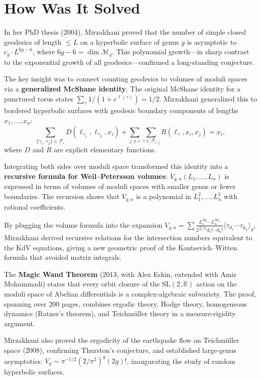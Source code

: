 \section{How Was It Solved}

In her PhD thesis (2004), Mirzakhani proved that the number of simple closed geodesics of length $\le L$ on a hyperbolic surface of genus $g$ is asymptotic to $c_g \cdot L^{6g-6}$, where $6g-6 = \dim\mathcal{M}_g$. This polynomial growth---in sharp contrast to the exponential growth of all geodesics---confirmed a long-standing conjecture.

The key insight was to connect counting geodesics to volumes of moduli spaces via a \textbf{generalized McShane identity}. The original McShane identity for a punctured torus states $\sum_{\gamma} 1/(1+e^{\ell(\gamma)}) = 1/2$. Mirzakhani generalized this to bordered hyperbolic surfaces with geodesic boundary components of lengths $x_1,\ldots,x_n$:
\[
\sum_{\{\gamma_1,\gamma_2\}\in\mathcal{F}_i} D(\ell_{\gamma_1},\ell_{\gamma_2},x_i) + \sum_{j\ne i}\sum_{\gamma\in\mathcal{F}_{i,j}} R(\ell_{\gamma},x_i,x_j) = x_i,
\]
where $D$ and $R$ are explicit elementary functions.

Integrating both sides over moduli space transformed this identity into a \textbf{recursive formula for Weil--Petersson volumes}: $V_{g,n}(L_1,\ldots,L_n)$ is expressed in terms of volumes of moduli spaces with smaller genus or fewer boundaries. The recursion shows that $V_{g,n}$ is a polynomial in $L_1^2,\ldots,L_n^2$ with rational coefficients.

By plugging the volume formula into the expansion $V_{g,n} = \sum \frac{L_1^{2d_1}\cdots L_n^{2d_n}}{2^{\sum d_i}d_1!\cdots d_n!}\langle\tau_{d_1}\cdots\tau_{d_n}\rangle_g$, Mirzakhani derived recursive relations for the intersection numbers equivalent to the KdV equations, giving a new geometric proof of the Kontsevich--Witten formula that avoided matrix integrals.

The \textbf{Magic Wand Theorem} (2013, with Alex Eskin, extended with Amir Mohammadi) states that every orbit closure of the $\mathrm{SL}(2,\mathbb{R})$ action on the moduli space of Abelian differentials is a complex-algebraic subvariety. The proof, spanning over 200 pages, combines ergodic theory, Hodge theory, homogeneous dynamics (Ratner's theorem), and Teichm\"uller theory in a measure-rigidity argument.

Mirzakhani also proved the ergodicity of the earthquake flow on Teichm\"uller space (2008), confirming Thurston's conjecture, and established large-genus asymptotics: $V_g \sim \pi^{-1/2}(2/\pi^2)^g(2g)!$, inaugurating the study of random hyperbolic surfaces.

